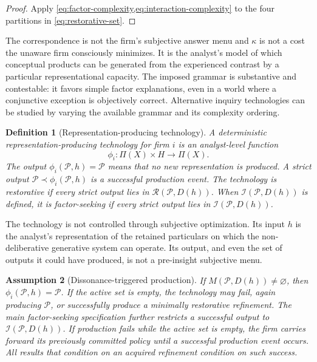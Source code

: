 \documentclass[11pt]{article}
\newtheorem{assumption}{Assumption}[section]
\newtheorem{definition}[assumption]{Definition}
\newcommand{\emptysetset}{\varnothing}
\begin{document}
\begin{proof}
Apply \cref{eq:factor-complexity,eq:interaction-complexity} to the four
partitions in \cref{eq:restorative-set}.
\end{proof}

The correspondence is not the firm's subjective answer menu and $\kappa$ is
not a cost the unaware firm consciously minimizes.  It is the analyst's model
of which conceptual products can be generated from the experienced contrast by
a particular representational capacity.  The imposed grammar is substantive
and contestable: it favors simple factor explanations, even in a world where a
conjunctive exception is objectively correct.  Alternative inquiry
technologies can be studied by varying the available grammar and its complexity
ordering.

\begin{definition}[Representation-producing technology]
\label{def:representation-technology}
A deterministic representation-producing technology for firm $i$ is an
analyst-level function
\[
\phi_i:\Pi(X)\times H\longrightarrow\Pi(X).
\]
The output $\phi_i(\mathcal P,h)=\mathcal P$ means that no new representation
is produced.  A strict output $\mathcal P\prec\phi_i(\mathcal P,h)$ is a
successful production event.  The technology is \emph{restorative} if every
strict output lies in $\mathcal R(\mathcal P,D(h))$.  When
$\mathcal I(\mathcal P,D(h))$ is defined, it is \emph{factor-seeking} if every
strict output lies in $\mathcal I(\mathcal P,D(h))$.
\end{definition}

The technology is not controlled through subjective optimization.  Its input
$h$ is the analyst's representation of the retained particulars on which the
non-deliberative generative system can operate.  Its output, and even the set of
outputs it could have produced, is not a pre-insight subjective menu.

\begin{assumption}[Dissonance-triggered production]
\label{ass:dissonance-trigger}
If $\widehat M(\mathcal P,D(h))\neq\emptysetset$, then
$\phi_i(\mathcal P,h)=\mathcal P$.  If the active set is empty, the technology
may fail, again producing $\mathcal P$, or successfully produce a minimally
restorative refinement.  The main factor-seeking specification further
restricts a successful output to $\mathcal I(\mathcal P,D(h))$.  If production
fails while the active set is empty, the firm carries forward its previously
committed policy until a successful production event occurs.  All results that
condition on an acquired refinement condition on such success.
\end{assumption}
\end{document}
